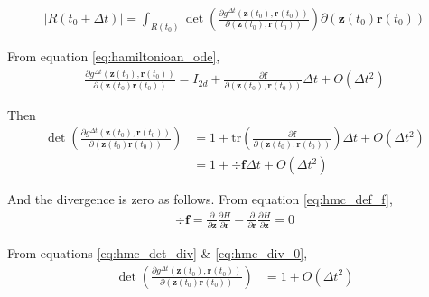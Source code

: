 \documentclass[a4]{article}
\begin{document}
\begin{equation}
\begin{aligned}
|R(t_0 + {\Delta}t)| = 
\int_{R(t_0)}
    \det
    \left( \frac{ \partial g^{{\Delta}t}(\bm{z}(t_0), \bm{r}(t_0)) }
                { \partial (\bm{z}(t_0) ,\bm{r}(t_0)) }
    \right)
\partial(\bm{z}(t_0)\bm{r}(t_0))\label{eq:hmc_volume_R_t1_deltat}
\end{aligned}
\end{equation}

From equation \ref{eq:hamiltonioan_ode},
\begin{equation}
\begin{aligned}
\frac{ \partial g^{{\Delta}t}(\bm{z}(t_0), \bm{r}(t_0))}
     { \partial (\bm{z}(t_0) \bm{r}(t_0)) }
 = I_{2d} + 
\frac{\partial \bm{f}}{\partial(\bm{z}(t_0), \bm{r}(t_0))}{\Delta}t
+ O({\Delta}t^2)
\end{aligned}
\end{equation}

Then
\begin{equation}
\begin{aligned}
\det\left(\frac{ \partial g^{{\Delta}t}(\bm{z}(t_0), \bm{r}(t_0))}
     { \partial (\bm{z}(t_0) \bm{r}(t_0)) }\right)
 &= 1 + \text{tr} \left( \frac{ \partial \bm{f} }
                       { \partial(\bm{z}(t_0), \bm{r}(t_0)) }
           \right){\Delta}t
+ O({\Delta}t^2)\\
 &= 1 + \div \bm{f}{\Delta}t + O({\Delta}t^2)\label{eq:hmc_det_div}
\end{aligned}
\end{equation}

And the divergence is zero as follows. From equation \ref{eq:hmc_def_f},
\begin{equation}
\begin{aligned}
\div\bm{f} = \frac{\partial}
                  {\partial{\bm{z}} }
             \frac{\partial H}
                  {\partial \bm{r} }
           - \frac{\partial}{\partial{\bm{r}}}
             \frac{\partial H}{\partial \bm{z} } = 0\label{eq:hmc_div_0}
\end{aligned}
\end{equation}

From equations \ref{eq:hmc_det_div} \& \ref{eq:hmc_div_0},
\begin{equation}
\begin{aligned}
\det\left(\frac{ \partial g^{{\Delta}t}(\bm{z}(t_0), \bm{r}(t_0))}
     { \partial (\bm{z}(t_0) \bm{r}(t_0)) }\right)
 &= 1 + O({\Delta}t^2)\label{eq:hmc_det_div_simplified}
\end{aligned}
\end{equation}
\end{document}
